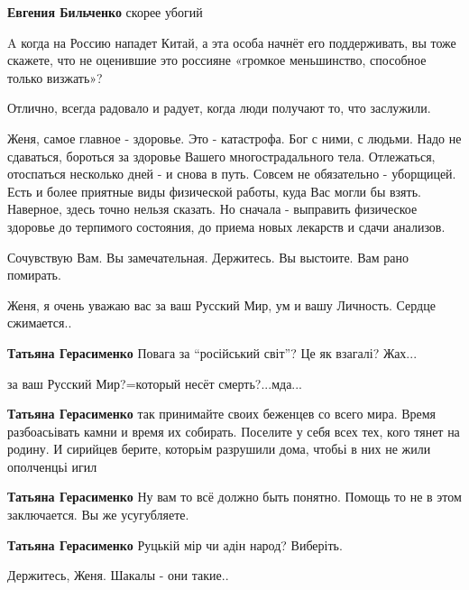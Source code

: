 \begin{itemize}
\begin{itemize}
\textbf{Евгения Бильченко} скорее убогий


A когда на Россию нападет Китай, а эта особа начнёт его поддерживать, вы тоже
скажете, что не оценившие это россияне «громкое меньшинство, способное только
визжать»?


Отлично, всегда радовало и радует, когда люди получают то, что заслужили.
\end{itemize} %


Женя, самое главное - здоровье. Это - катастрофа. Бог с ними, с людьми. Надо не
сдаваться, бороться за здоровье Вашего многострадального тела. Отлежаться,
отоспаться несколько дней - и снова в путь. Совсем не обязательно - уборщицей.
Есть и более приятные виды физической работы, куда Вас могли бы взять.
Наверное, здесь точно нельзя сказать. Но сначала - выправить физическое
здоровье до терпимого состояния, до приема новых лекарств и сдачи анализов.

Сочувствую Вам. Вы замечательная. Держитесь. Вы выстоите. Вам рано помирать.


Женя, я очень уважаю вас за ваш Русский Мир, ум и вашу Личность. Сердце
сжимается..

\begin{itemize} %
\textbf{Татьяна Герасименко} Повага за \enquote{російський світ}? Це як взагалі? Жах...

за ваш Русский Мир?=который несёт смерть?...мда...

\textbf{Татьяна Герасименко} так принимайте своих беженцев со всего мира. Время разбоасьівать камни и время их собирать. Поселите у себя всех тех, кого тянет на родину. И сирийцев берите, которьім разрушили дома, чтобьі в них не жили ополченцьі игил

\textbf{Татьяна Герасименко} Ну вам то всё должно быть понятно. Помощь то не в этом заключается. Вы же усугубляете.

\textbf{Татьяна Герасименко}
Руцькій мір чи адін народ?
Виберіть.

Держитесь, Женя. Шакалы - они такие..
\end{itemize} %



\end{itemize}
